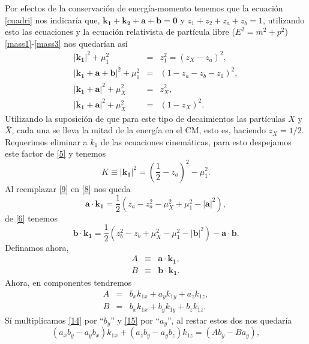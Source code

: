 Por efectos de la conservación de energía-momento tenemos que la ecuación \ref{cuadri} nos indicaría que, \(\mathbf{k_1}+\mathbf{k_2}+\mathbf{a}+\mathbf{b}=\mathbf{0}\) y \(z_1+z_2+z_a+z_b=1\), utilizando esto las ecuaciones y la ecuación relativista de partícula libre (\(E^2=m^2+p^2\)) \ref{mass1}-\ref{mass3} nos quedarían así
\begin{eqnarray}
    |\mathbf{k_1}|^2+\mu_{1}^2 &=& z^2_1 = (z_X-z_a)^2, \label{5} \\
    |\mathbf{k_1}+\mathbf{a}+\mathbf{b}|^2 +\mu^2_1&=& (1-z_a-z_b-z_1)^2 ,\label{6} \\
    |\mathbf{k_1}+\mathbf{a}|^2+\mu^2_{X} &=& z^2_{X}, \label{7} \\
    |\mathbf{k_1}+\mathbf{a}|^2+\mu^2_{X} &=& (1-z_{X})^2 \label{8}.
\end{eqnarray}
Utilizando la suposición de que para este tipo de decaimientos las partículas \(X\) y \(\bar{X}\), cada una se lleva la mitad de la energía en el CM, esto es, haciendo \(z_{X}=1/2\). Requerimos eliminar a \(k_{1}\) de las ecuaciones cinemáticas, para esto despejamos este factor de \ref{5} y tenemos
\begin{equation}
    K\equiv|\mathbf{k_{1}}|^2=\left(\frac{1}{2}-z_a\right)^2-\mu^2_1\label{9}.
\end{equation}
Al reemplazar \ref{9} en \ref{8} nos queda
\begin{equation}
    \mathbf{a}\cdot\mathbf{k_1}=\frac{1}{2}(z_a-z^2_a-\mu^2_{X}+\mu^2_1-|\mathbf{a}|^2),\label{10}
\end{equation}
de \ref{6} tenemos
\begin{equation}
    \mathbf{b}\cdot\mathbf{k_1}=\frac{1}{2}(z^2_b-z_b+\mu^2_{X}-\mu^2_{1}-|\mathbf{b}|^2)-\mathbf{a}\cdot\mathbf{b}.\label{11}
\end{equation}
Definamos ahora, 
\begin{eqnarray}
    A &\equiv& \mathbf{a}\cdot\mathbf{k_1}, \label{A}\\
    B &\equiv& \mathbf{b}\cdot\mathbf{k_1}. \label{B}
\end{eqnarray}
Ahora, en componentes tendremos
\begin{eqnarray}
    A &=& b_xk_{1x}+a_yk_{1y}+a_zk_{1z}, \label{14} \\
    B &=& b_xk_{1x}+b_yk_{1y}+b_zk_{1z}. \label{15}
\end{eqnarray}
Sí multiplicamos \ref{14} por ``\(b_y\)'' y \ref{15} por ``\(a_y\)'', al restar estos dos nos quedaría
\begin{equation}
    (a_xb_y-a_yb_x)k_{1x} + (a_zb_y - a_yb_z)k_{1z} = (Ab_y-Ba_y),\label{16}
\end{equation}
